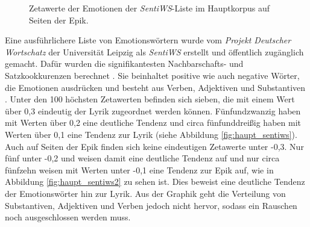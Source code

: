 \documentclass[a4paper,10p]{article}
\begin{document}
\begin{figure}{}
\begin{minipage}[b]{.45\linewidth}
        \caption{Zetawerte der Emotionen der \textit{SentiWS}-Liste im Hauptkorpus auf Seiten der Epik.}  
        \label{haupt_sentiws2}
    \end{minipage}
\end{figure}

Eine ausführlichere Liste von Emotionswörtern wurde vom \textit{Projekt Deutscher Wortschatz} der Universität Leipzig als \textit{SentiWS} erstellt und öffentlich zugänglich gemacht. Dafür wurden die signifikantesten Nachbarschafts- und Satzkookkurenzen berechnet \citep{Sentiws}. Sie beinhaltet positive wie auch negative Wörter, die Emotionen ausdrücken und besteht aus Verben, Adjektiven und Substantiven \citep[vgl.]{Remus}. Unter den 100 höchsten Zetawerten befinden sich sieben, die mit einem Wert über 0,3 eindeutig der Lyrik zugeordnet werden können. Fünfundzwanzig haben mit Werten über 0,2 eine deutliche Tendenz und circa fünfunddreißig haben mit Werten über 0,1 eine Tendenz zur Lyrik (siehe Abbildung \ref{fig:haupt_sentiws}). Auch auf Seiten der Epik finden sich keine eindeutigen Zetawerte unter -0,3. Nur fünf unter -0,2 und weisen damit eine deutliche Tendenz auf und nur circa fünfzehn weisen mit Werten unter -0,1 eine Tendenz zur Epik auf, wie in Abbildung \ref{fig:haupt_sentiws2} zu sehen ist. Dies beweist eine deutliche Tendenz der Emotionswörter hin zur Lyrik. Aus der Graphik geht die Verteilung von Substantiven, Adjektiven und Verben jedoch nicht hervor, sodass ein Rauschen noch ausgeschlossen werden muss. \par 
\end{document}

